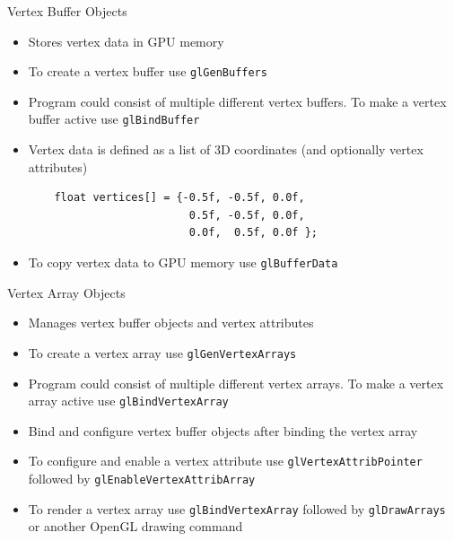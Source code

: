 \documentclass{beamer}
\begin{document}
\begin{frame}[fragile]{Vertex Buffer Objects}
    \begin{itemize}
        \item Stores vertex data in GPU memory
        \item To create a vertex buffer use {\color{blue}\verb"glGenBuffers"}
        \item Program could consist of multiple different vertex buffers. To make a vertex buffer active use
            {\color{blue}\verb"glBindBuffer"}
        \item Vertex data is defined as a list of 3D coordinates (and optionally vertex attributes)
 \begin{verbatim}
    float vertices[] = {-0.5f, -0.5f, 0.0f,
                         0.5f, -0.5f, 0.0f,
                         0.0f,  0.5f, 0.0f };
 \end{verbatim}
        \item To copy vertex data to GPU memory use {\color{blue}\verb"glBufferData"}
    \end{itemize}
\end{frame}

\begin{frame}[fragile]{Vertex Array Objects}
    \begin{itemize}
        \item Manages vertex buffer objects and vertex attributes
        \item To create a vertex array use {\color{blue}\verb"glGenVertexArrays"}
        \item Program could consist of multiple different vertex arrays. To make a vertex array active use
            {\color{blue}\verb"glBindVertexArray"}
        \item Bind and configure vertex buffer objects after binding the vertex array
        \item To configure and enable a vertex attribute use {\color{blue}\verb"glVertexAttribPointer"} followed by
            {\color{blue}\verb"glEnableVertexAttribArray"}
        \item To render a vertex array use {\color{blue}\verb"glBindVertexArray"} followed by
            {\color{blue}\verb"glDrawArrays"} or another OpenGL drawing command
    \end{itemize}
\end{frame}
\end{document}

